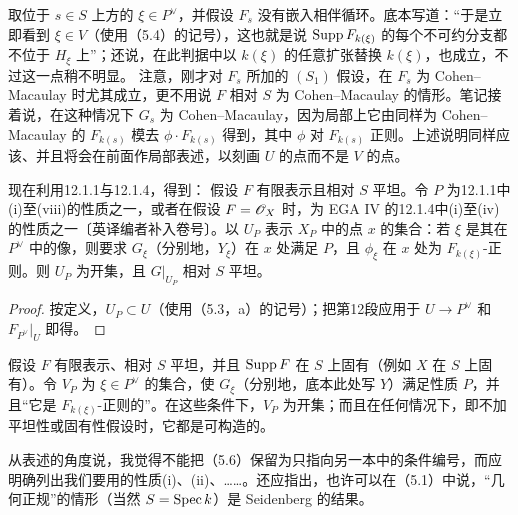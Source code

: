 取位于 $s\in S$ 上方的 $\xi\in P^\vee$，并假设 $F_s$ 没有嵌入相伴循环。底本写道：“于是立即看到 $\xi\in V$（使用（5.4）的记号），这也就是说 $\operatorname{Supp} F_{k(\xi)}$ 的每个不可约分支都不位于 $H_\xi$ 上”；还说，在此判据中以 $k(\xi)$ 的任意扩张替换 $k(\xi)$，也成立，不过这一点稍不明显。
注意，刚才对 $F_s$ 所加的 $(S_1)$ 假设，在 $F_s$ 为 Cohen--Macaulay 时尤其成立，更不用说 $F$ 相对 $S$ 为 Cohen--Macaulay 的情形。笔记接着说，在这种情况下 $G_s$ 为 Cohen--Macaulay，因为局部上它由同样为 Cohen--Macaulay 的 $F_{k(s)}$ 模去 $\phi\cdot F_{k(s)}$ 得到，其中 $\phi$ 对 $F_{k(s)}$ 正则。上述说明同样应该、并且将会在前面作局部表述，以刻画 $U$ 的点而不是 $V$ 的点。

现在利用12.1.1与12.1.4，得到：
假设 $F$ 有限表示且相对 $S$ 平坦。令 $P$ 为12.1.1中(i)至(viii)的性质之一，或者在假设 $F=\mathscr O_X$ 时，为 EGA IV 的12.1.4中(i)至(iv)的性质之一〔英译编者补入卷号〕。以 $U_P$ 表示 $X_P$ 中的点 $x$ 的集合：若 $\xi$ 是其在 $P^\vee$ 中的像，则要求 $G_\xi$（分别地，$Y_\xi$）在 $x$ 处满足 $P$，且 $\phi_\xi$ 在 $x$ 处为 $F_{k(\xi)}$-正则。则 $U_P$ 为开集，且 $G|_{U_P}$ 相对 $S$ 平坦。
\begin{proof}
按定义，$U_P\subset U$（使用（5.3，a）的记号）；把第12段应用于
$U\to P^\vee$ 和 $F_{P^\vee}|_U$ 即得。
\end{proof}

假设 $F$ 有限表示、相对 $S$ 平坦，并且 $\operatorname{Supp} F$ 在 $S$ 上固有（例如 $X$ 在 $S$ 上固有）。令 $V_P$ 为 $\xi\in P^\vee$ 的集合，使 $G_\xi$（分别地，底本此处写 $Y$）满足性质 $P$，并且“它是 $F_{k(\xi)}$-正则的”。在这些条件下，$V_P$ 为开集；而且在任何情况下，即不加平坦性或固有性假设时，它都是可构造的。

从表述的角度说，我觉得不能把（5.6）保留为只指向另一本中的条件编号，而应明确列出我们要用的性质(i)、(ii)、……。还应指出，也许可以在（5.1）中说，“几何正规”的情形（当然 $S=\operatorname{Spec} k$）是 Seidenberg 的结果。

